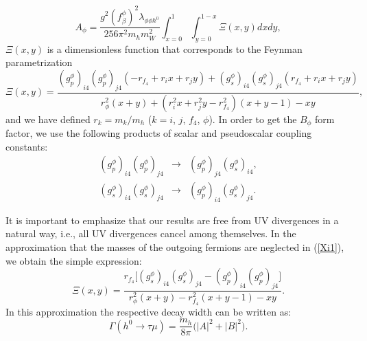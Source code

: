\documentclass[a4paper]{jpconf}
\begin{document}
\begin{equation}
A_\phi=\frac{g^{2}(f_\beta^{\phi})^2\lambda_{\phi\phi h^0}}{256\pi^2m_{h}m_{W}^{2}}\int_{x=0}^{1}\int_{y=0}^{1-x}\Xi(x,y)dxdy,
\label{A}
\end{equation}
 $\Xi(x,y)$ is a dimensionless function that corresponds to the Feynman parametrization
\begin{equation}\label{Xi1}
\Xi(x,y)=\frac{(g_{p}^{\phi})_{i4}(g_{p}^{\phi})_{j4} (-r_{f_4}+r_{i}x+r_{j}y) +(g_{s}^{\phi})_{i4}(g_{s}^{\phi})_{j4}(r_{f_4}+r_{i}x+r_{j}y)}{r_{\phi}^{2}(x+y)+(r_{i}^{2}x+r_{j}^{2}y-r_{f_4}^{2})(x+y-1)-xy},
\end{equation}
and we have defined $r_k =m_k/m_h$ ($k= i$, $j$, $f_4$, $\phi$). In order to get the $B_\phi$ form factor, we use the following products of scalar and pseudoscalar coupling constants:\\
\begin{eqnarray}
(g_{p}^{\phi})_{i4}(g_{p}^{\phi})_{j4} &\to& (g_{p}^{\phi})_{j4}(g_{s}^{\phi})_{i4},\nonumber \\
(g_{s}^{\phi})_{i4}(g_{s}^{\phi})_{j4} &\to& (g_{p}^{\phi})_{i4}(g_{s}^{\phi})_{j4}.\nonumber
\end{eqnarray}

It is important to emphasize that our results are free from UV divergences in a natural way, i.e., all UV divergences cancel among themselves. In the approximation that the masses of the outgoing fermions are neglected in (\ref{Xi1}), we obtain the simple expression:\\

\begin{equation}\label{Xi2}
\Xi(x,y)=\frac{r_{f_4}\big[(g_{s}^{\phi})_{i4}(g_{s}^{\phi})_{j4}-(g_{p}^{\phi})_{i4}(g_{p}^{\phi})_{j4}\big]}{r_{\phi}^{2}(x+y)-r_{f_4}^{2}(x+y-1)-xy}.
\end{equation}
In this approximation the respective decay width can be written as:
\begin{equation}\label{Br-h}
\Gamma(h^0\to\tau\mu)=\frac{m_h}{8\pi}\big( |A|^2+|B|^2 \big).
\end{equation}
\end{document}
